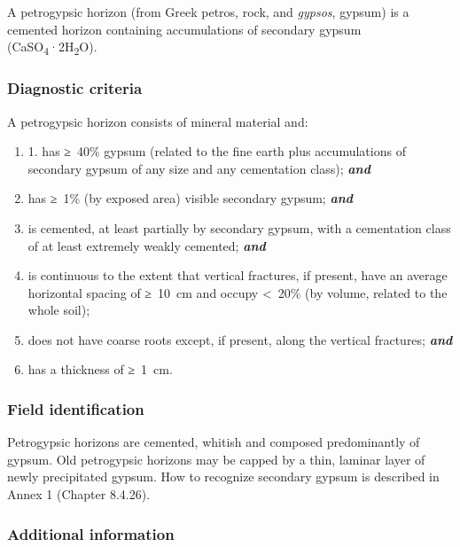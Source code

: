 \documentclass[
  letterpaper,
  DIV=11,
  numbers=noendperiod]{scrreprt}
\providecommand{\tightlist}{%
  \setlength{\itemsep}{0pt}\setlength{\parskip}{0pt}}\usepackage{longtable,booktabs,array}
\begin{document}
A petrogypsic horizon (from Greek petros, rock, and \emph{gypsos},
gypsum) is a cemented horizon containing accumulations of secondary
gypsum (CaSO\textsubscript{4}·2H\textsubscript{2}O).

\hypertarget{diagnostic-criteria-25}{%
\subsubsection{Diagnostic criteria}\label{diagnostic-criteria-25}}

A petrogypsic horizon consists of mineral material and:

\begin{enumerate}
\def\labelenumi{\arabic{enumi}.}
\tightlist
\item
  1. has ≥~40\% gypsum (related to the fine earth plus accumulations of
  secondary gypsum of any size and any cementation class);
  \textbf{\emph{and}}
\item
  has ≥~1\% (by exposed area) visible secondary gypsum;
  \textbf{\emph{and}}
\item
  is cemented, at least partially by secondary gypsum, with a
  cementation class of at least extremely weakly cemented;
  \textbf{\emph{and}}
\item
  is continuous to the extent that vertical fractures, if present, have
  an average horizontal spacing of ≥~10~cm and occupy \textless~20\% (by
  volume, related to the whole soil);
\item
  does not have coarse roots except, if present, along the vertical
  fractures; \textbf{\emph{and}}
\item
  has a thickness of ≥~1~cm.
\end{enumerate}

\hypertarget{field-identification-19}{%
\subsubsection{Field identification}\label{field-identification-19}}

Petrogypsic horizons are cemented, whitish and composed predominantly of
gypsum. Old petrogypsic horizons may be capped by a thin, laminar layer
of newly precipitated gypsum. How to recognize secondary gypsum is
described in Annex 1 (Chapter 8.4.26).

\hypertarget{additional-information-13}{%
\subsubsection{Additional information}\label{additional-information-13}}
\end{document}
